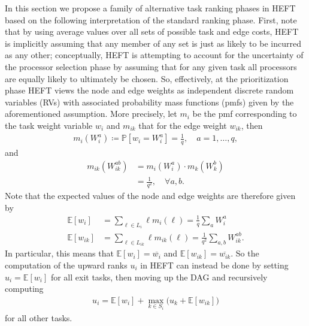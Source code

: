\documentclass[12pt]{article}
\def\P{\mathbb{P}}
\def\E{\mathbb{E}}
\begin{document}
In this section we propose a family of alternative task ranking phases in HEFT based on the following interpretation of the standard ranking phase. First, note that by using average values over all sets of possible task and edge costs, HEFT is implicitly assuming that any member of any set is just as likely to be incurred as any other; conceptually, HEFT is attempting to account for the uncertainty of the processor selection phase by assuming that for any given task all processors are equally likely to ultimately be chosen. So, effectively, at the prioritization phase HEFT views the node and edge weights as independent discrete random variables (RVs) with associated probability mass functions (pmfs) given by the aforementioned assumption. More precisely, let $m_i$ be the pmf corresponding to the task weight variable $w_i$ and $m_{ik}$ that for the edge weight $w_{ik}$, then  
\begin{align*}
m_i(W_i^a) \coloneqq \P[w_i = W_i^a] = \frac{1}{q}, \quad a = 1, \dots, q,
\end{align*}
and   
\begin{align*}
m_{ik}(W_{ik}^{ab}) &= m_i(W_i^a) \cdot m_k(W_k^b) \\
&= \frac{1}{q^2}, \quad \forall a, b.
\end{align*}
Note that the expected values of the node and edge weights are therefore given by
\begin{align}
\E[w_i] &= \sum_{\ell \in L_i} \ell m_i(\ell) = \frac{1}{q} \sum_{a} W_i^a \label{eq.expected_node}\\
\E[w_{ik}] &= \sum_{\ell \in L_{ik}} \ell m_{ik}(\ell) = \frac{1}{q^2} \sum_{a, b} W_{ik}^{ab} \label{eq.expected_edge}.
\end{align}
In particular, this means that $\E[w_i] = \overline{w_i}$ and $\E[w_{ik}] = \overline{w_{ik}}$. So the computation of the upward ranks $u_i$ in HEFT can instead be done by setting $u_i = \E[w_i]$ for all exit tasks, then moving up the DAG and recursively computing
\begin{align}
u_i = \E[w_i] + \max_{k \in S_i} \big( u_k + \E[w_{ik}] \big) \label{eq.ur_expectation}
\end{align}
for all other tasks.
\end{document}
